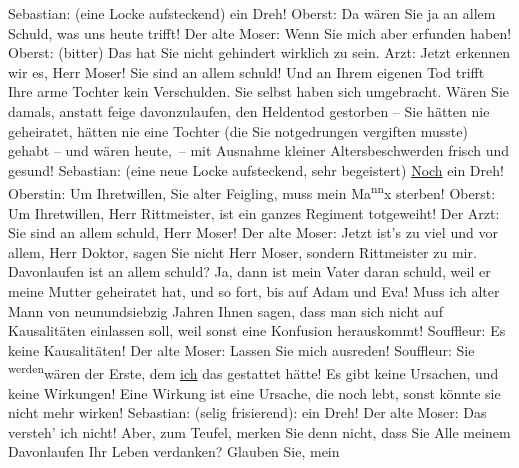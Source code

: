 \begin{ledgroupsized}[t]{13cm}
           \pstart
           Sebastian: (eine Locke aufsteckend)  ein Dreh!\pend
           \pstart
           Oberst: Da wären Sie ja an allem Schuld, was uns heute trifft!\pend
           \pstart
           \introOben{}\introOben{}Der alte Moser: Wenn Sie mich aber erfunden haben!\pend
           \pstart
           Oberst: (bitter) Das hat Sie nicht gehindert wirklich zu sein.\pend
           \pstart
           Arzt: Jetzt erkennen wir es, Herr Moser! Sie sind an allem schuld! Und an Ihrem
					eigenen Tod trifft Ihre arme Tochter kein Verschulden. Sie selbst haben sich
					umgebracht. Wären Sie damals, anstatt feige davonzulaufen, den Heldentod
					gestorben – Sie hätten nie geheiratet, hätten nie eine Tochter (die Sie
					notgedrungen vergiften musste) gehabt – und wären heute, – mit Ausnahme kleiner
					Altersbeschwerden frisch und gesund!\pend
           \pstart
           Sebastian: (eine neue Locke aufsteckend, sehr begeistert) \uline{Noch} ein Dreh!\pend
           \pstart
           Oberstin: Um Ihretwillen, Sie alter Feigling, muss mein Ma\substVorne{}\textsuperscript{nn}\substDazwischen{}x\substHinten{} sterben!\pend
           \pstart
           Oberst: Um Ihretwillen, Herr Rittmeister, ist ein ganzes Regiment totgeweiht!\pend
           \pstart
           Der Arzt: Sie sind an allem schuld, Herr Moser!\pend
           \pstart
           Der alte Moser: Jetzt ist’s zu viel und vor allem, Herr Doktor, sagen Sie nicht
					Herr Moser, sondern Rittmeister zu mir. 
					Davonlaufen ist an allem schuld? Ja, {\pb}dann ist mein Vater daran
					schuld, weil er meine Mutter geheiratet hat, und so fort, bis auf Adam und Eva!
					Muss ich alter Mann von neunundsiebzig Jahren Ihnen sagen, dass man sich nicht
					auf Kausalitäten einlassen soll, weil sonst eine Konfusion herauskommt!\pend
           \pstart
           Souffleur: Es  keine Kausalitäten!\pend
           \pstart
           Der alte Moser: Lassen Sie mich ausreden!\pend
           \pstart
           Souffleur: Sie \substVorne{}\textsuperscript{werden}{\allowbreak}\substDazwischen{}wären\substHinten{} der Erste, dem \uline{ich} das gestattet hätte!
					Es gibt keine Ursachen, und keine Wirkungen! Eine Wirkung ist eine Ursache, die
					noch lebt, sonst könnte sie nicht mehr wirken!\pend
           \pstart
           Sebastian: (selig frisierend):  ein Dreh!\pend
           \pstart
           Der alte Moser: Das versteh’ ich nicht! Aber, zum Teufel, merken Sie denn nicht,
					dass Sie Alle meinem Davonlaufen Ihr Leben verdanken? Glauben Sie, mein

\end{ledgroupsized}
